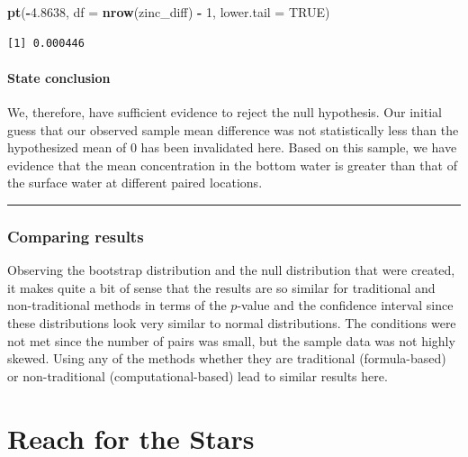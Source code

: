 \documentclass[12pt, krantz2,]{krantz}
\makeatletter
\newenvironment{Shaded}{\begin{snugshade}}{\end{snugshade}}
\newcommand{\DataTypeTok}[1]{\textcolor[rgb]{0.27,0.27,0.27}{#1}}
\newcommand{\DecValTok}[1]{\textcolor[rgb]{0.06,0.06,0.06}{#1}}
\newcommand{\FloatTok}[1]{\textcolor[rgb]{0.06,0.06,0.06}{#1}}
\newcommand{\KeywordTok}[1]{\textcolor[rgb]{0.27,0.27,0.27}{\textbf{#1}}}
\newcommand{\NormalTok}[1]{#1}
\newcommand{\OperatorTok}[1]{\textcolor[rgb]{0.43,0.43,0.43}{\textbf{#1}}}
\newcommand{\OtherTok}[1]{\textcolor[rgb]{0.37,0.37,0.37}{#1}}
\newcommand{\StringTok}[1]{\textcolor[rgb]{0.5,0.5,0.5}{#1}}
\newenvironment{kframe}{%
\medskip{}
\setlength{\fboxsep}{.8em}
 \def\at@end@of@kframe{}%
 \ifinner\ifhmode%
  \def\at@end@of@kframe{\end{minipage}}%
  \begin{minipage}{\columnwidth}%
 \fi\fi%
 \def\FrameCommand##1{\hskip\@totalleftmargin \hskip-\fboxsep
 \colorbox{shadecolor}{##1}\hskip-\fboxsep
     \hskip-\linewidth \hskip-\@totalleftmargin \hskip\columnwidth}%
 \MakeFramed {\advance\hsize-\width
   \@totalleftmargin\z@ \linewidth\hsize
   \@setminipage}}%
 {\par\unskip\endMakeFramed%
 \at@end@of@kframe}
\renewenvironment{Shaded}{\begin{kframe}}{\end{kframe}}
\makeatother
\begin{document}
\begin{Shaded}
\begin{Highlighting}[]
\KeywordTok{pt}\NormalTok{(}\OperatorTok{-}\FloatTok{4.8638}\NormalTok{, }\DataTypeTok{df =} \KeywordTok{nrow}\NormalTok{(zinc_diff) }\OperatorTok{-}\StringTok{ }\DecValTok{1}\NormalTok{, }\DataTypeTok{lower.tail =} \OtherTok{TRUE}\NormalTok{)}
\end{Highlighting}
\end{Shaded}

\begin{verbatim}
[1] 0.000446
\end{verbatim}

\hypertarget{state-conclusion-4}{%
\subsubsection*{State conclusion}\label{state-conclusion-4}}


We, therefore, have sufficient evidence to reject the null hypothesis. Our initial guess that our observed sample mean difference was not statistically less than the hypothesized mean of 0 has been invalidated here. Based on this sample, we have evidence that the mean concentration in the bottom water is greater than that of the surface water at different paired locations.

\begin{center}\rule{0.5\linewidth}{\linethickness}\end{center}

\hypertarget{comparing-results-4}{%
\subsection{Comparing results}\label{comparing-results-4}}

Observing the bootstrap distribution and the null distribution that were created, it makes quite a bit of sense that the results are so similar for traditional and non-traditional methods in terms of the \(p\)-value and the confidence interval since these distributions look very similar to normal distributions. The conditions were not met since the number of pairs was small, but the sample data was not highly skewed. Using any of the methods whether they are traditional (formula-based) or non-traditional (computational-based) lead to similar results here.

\hypertarget{appendixC}{%
\chapter{Reach for the Stars}\label{appendixC}}
\end{document}
